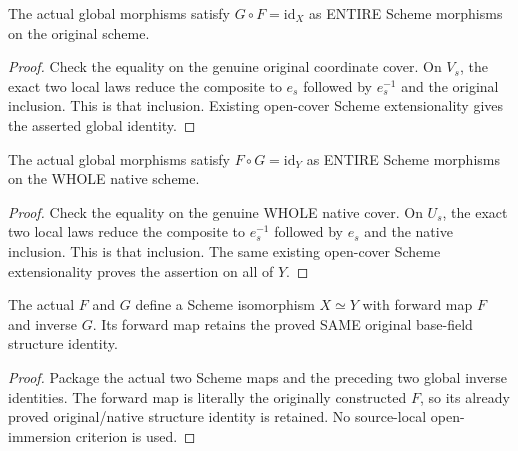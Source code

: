 \begin{theorem}
\label{thm:seven-original-native-global-forward-inverse-route}
\leanok
{}
The actual global morphisms satisfy $G\circ F=\mathrm{id}_X$ as ENTIRE
Scheme morphisms on the original scheme.
\end{theorem}
\begin{proof}
Check the equality on the genuine original coordinate cover. On $V_s$, the
exact two local laws reduce the composite to $e_s$ followed by $e_s^{-1}$
and the original inclusion. This is that inclusion. Existing open-cover
Scheme extensionality gives the asserted global identity.
\end{proof}

\begin{theorem}
\label{thm:seven-original-native-global-inverse-forward-route}
\leanok
{}
The actual global morphisms satisfy $F\circ G=\mathrm{id}_Y$ as ENTIRE
Scheme morphisms on the WHOLE native scheme.
\end{theorem}
\begin{proof}
Check the equality on the genuine WHOLE native cover. On $U_s$, the exact
two local laws reduce the composite to $e_s^{-1}$ followed by $e_s$ and
the native inclusion. This is that inclusion. The same existing open-cover
Scheme extensionality proves the assertion on all of $Y$.
\end{proof}

\begin{theorem}
\label{thm:seven-original-native-global-isomorphism-route}
\leanok
{}
The actual $F$ and $G$ define a Scheme isomorphism $X\simeq Y$ with forward
map $F$ and inverse $G$. Its forward map retains the proved SAME original
base-field structure identity.
\end{theorem}
\begin{proof}
Package the actual two Scheme maps and the preceding two global inverse
identities. The forward map is literally the originally constructed $F$,
so its already proved original/native structure identity is retained.
No source-local open-immersion criterion is used.
\end{proof}

